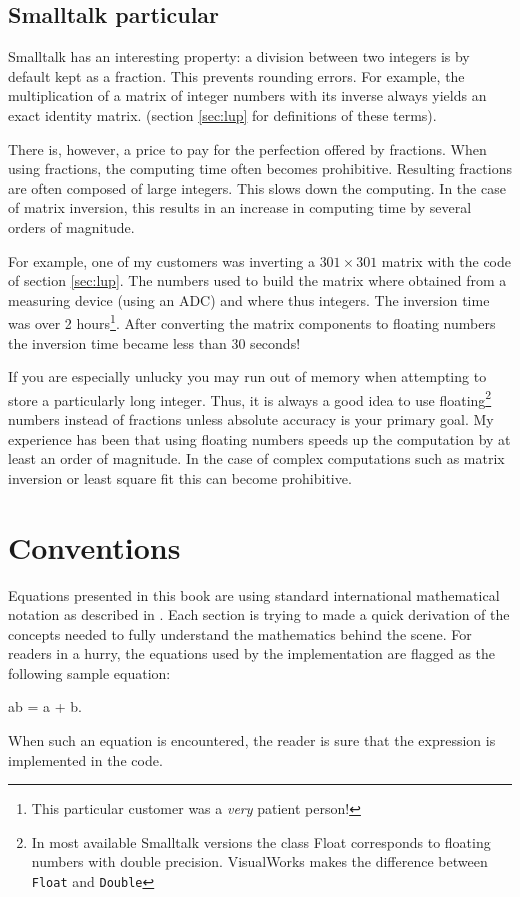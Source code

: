 \documentclass[twoside]{book}
\begin{document}
\subsection{Smalltalk particular}
Smalltalk has an interesting property: a division between two
integers is by default kept as a fraction. This prevents rounding
errors. For example, the multiplication of a matrix of integer
numbers with its inverse always yields an exact identity matrix.
(\cf section \ref{sec:lup} for definitions of these terms).

There is, however, a price to pay for the perfection offered by
fractions. When using fractions, the computing time often becomes
prohibitive. Resulting fractions are often composed of large
integers. This slows down the computing. In the case of matrix
inversion, this results in an increase in computing time by
several orders of magnitude.

For example, one of my customers was inverting a $301\times 301$
matrix with the code of section \ref{sec:lup}. The numbers used to
build the matrix where obtained from a measuring device (using an
ADC) and where thus integers. The inversion time was over 2
hours\footnote{This particular customer was a {\sl very} patient
person!}. After converting the matrix components to floating
numbers the inversion time became less than 30 seconds!

If you are especially unlucky you may run out of memory when
attempting to store a particularly long integer. Thus, it is
always a good idea to use floating\footnote{In most available
Smalltalk versions the class Float corresponds to floating numbers
with double precision. VisualWorks makes the difference between
{\tt Float} and {\tt Double}} numbers instead of fractions unless
absolute accuracy is your primary goal. My experience has been
that using floating numbers speeds up the computation by at least
an order of magnitude. In the case of complex computations such as
matrix inversion or least square fit this can become prohibitive.

\section{Conventions}
Equations presented in this book are using standard international
mathematical notation as described in \cite{Knuth1}. Each section
is trying to made a quick derivation of the concepts needed to
fully understand the mathematics behind the scene. For readers in
a hurry, the equations used by the implementation are flagged as
the following sample equation:
\begin{mainEquation}
\ln ab = \ln a + \ln b.
\end{mainEquation}
When such an equation is encountered, the reader is sure that the
expression is implemented in the code.
\end{document}
